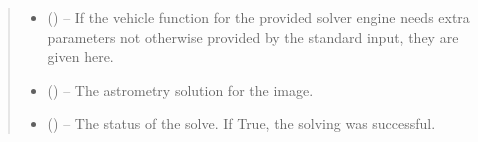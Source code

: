 \documentclass[letterpaper,11pt,english]{sphinxmanual}
\begin{document}
\begin{savenotes}
\begin{fulllineitems}
\begin{savenotes}
\begin{fulllineitems}
\begin{quote}
\begin{description}
\begin{itemize}
\item {} 
\sphinxAtStartPar
{} (\sphinxstyleliteralemphasis{\sphinxupquote{, }}) – If the vehicle function for the provided solver engine needs
extra parameters not otherwise provided by the standard input,
they are given here.

\end{itemize}

\sphinxAtStartPar
\begin{itemize}
\item {} 
\sphinxAtStartPar
{} () – The astrometry solution for the image.

\item {} 
\sphinxAtStartPar
{} () – The status of the solve. If True, the solving was successful.

\end{itemize}


\end{description}\end{quote}

\end{fulllineitems}\end{savenotes}



\end{fulllineitems}
\end{savenotes}
\end{document}
